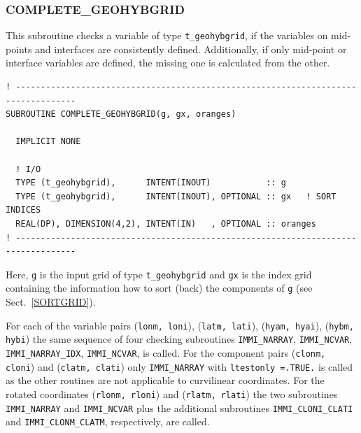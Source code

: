 \documentclass[11pt,twoside]{article}
\begin{document}
\subsubsection{COMPLETE\_GEOHYBGRID\label{COMPLETEGRID}}
This subroutine checks a variable of type \verb|t_geohybgrid|,
if the variables on mid-points and interfaces are consistently
defined. Additionally, if only mid-point or interface variables are
defined, the missing one is calculated from the other.
\begin{verbatim}
! ----------------------------------------------------------------------------------
SUBROUTINE COMPLETE_GEOHYBGRID(g, gx, oranges)

  IMPLICIT NONE

  ! I/O
  TYPE (t_geohybgrid),      INTENT(INOUT)           :: g
  TYPE (t_geohybgrid),      INTENT(INOUT), OPTIONAL :: gx   ! SORT INDICES
  REAL(DP), DIMENSION(4,2), INTENT(IN)   , OPTIONAL :: oranges
! ----------------------------------------------------------------------------------
\end{verbatim}
Here, \verb|g| is the input grid of type \verb|t_geohybgrid|
and \verb|gx| is the index grid containing the information how to sort (back)
the components of \verb|g| (see  Sect.~\ref{SORTGRID}).

For each of the variable pairs (\verb|lonm, loni|), (\verb|latm, lati|),
 (\verb|hyam, hyai|), (\verb|hybm, hybi|) the same sequence of four
 checking subroutines 
\verb|IMMI_NARRAY|, \verb|IMMI_NCVAR|, \verb|IMMI_NARRAY_IDX|,
\verb|IMMI_NCVAR|, is called. 
For the component pairs (\verb|clonm, cloni|) and (\verb|clatm, clati|)
only \verb|IMMI_NARRAY| with \verb|ltestonly =.TRUE.| is called as the
other routines are not applicable to curvilinear coordinates.
For the rotated coordinates (\verb|rlonm, rloni|) and
(\verb|rlatm, rlati|) the two subroutines \verb|IMMI_NARRAY| and 
\verb|IMMI_NCVAR| plus the additional subroutines \verb|IMMI_CLONI_CLATI| 
and \verb|IMMI_CLONM_CLATM|, respectively, are called.

\end{document}
